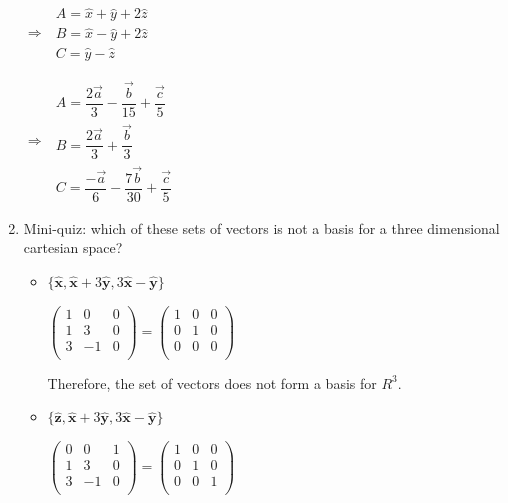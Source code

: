 \documentclass[fleqn]{article}
\begin{document}
\begin{enumerate}
  
  $\Rightarrow$ 
  $
  \begin{array}{lll}
    A = \hat{x}+\hat{y}+2\hat{z} \\
    B = \hat{x}-\hat{y}+2\hat{z}\\
    C = \hat{y}-\hat{z}
  \end{array}  
  $
  
  \bigbreak
  
  $\Rightarrow$ 
  $
  \begin{array}{lll}
    A = \dfrac{2\overrightarrow{a}}{3}-\dfrac{\overrightarrow{b}}{15}+\dfrac{\overrightarrow{c}}{5} \\
    B = \dfrac{2\overrightarrow{a}}{3}+\dfrac{\overrightarrow{b}}{3} \\
    C = \dfrac{-\overrightarrow{a}}{6}-\dfrac{7\overrightarrow{b}}{30}+\dfrac{\overrightarrow{c}}{5}
  \end{array}  
  $
  
  
  \item Mini-quiz: which of these sets of vectors is not a basis for a three dimensional cartesian space? 
  \begin{itemize}
  \item $\{ \mathbf{\hat{x}}, \mathbf{\hat{x}}+3\mathbf{\hat{y}}, 3\mathbf{\hat{x}}-\mathbf{\hat{y}} \}$
  
  \noindent
  $\displaystyle
    \begin{pmatrix}
      1 & 0 & 0 \\
      1 & 3 & 0 \\ 
      3 & -1 & 0 \\ 
    \end{pmatrix}
    =
    \begin{pmatrix}
      1 & 0 & 0 \\
      0 & 1 & 0 \\ 
      0 & 0 & 0 \\ 
    \end{pmatrix}
  $
  
  Therefore, the set of vectors does not form a basis for $R^3$.
  
  
  \item $\{ \mathbf{\hat{z}}, \mathbf{\hat{x}}+3\mathbf{\hat{y}}, 3\mathbf{\hat{x}}-\mathbf{\hat{y}}\}$
  
  \noindent
  $\displaystyle
    \begin{pmatrix}
      0 & 0 & 1 \\
      1 & 3 & 0 \\ 
      3 & -1 & 0 \\ 
    \end{pmatrix}
    =
    \begin{pmatrix}
      1 & 0 & 0 \\
      0 & 1 & 0 \\ 
      0 & 0 & 1 \\ 
    \end{pmatrix}
  $
  

\end{itemize}
\end{enumerate}
\end{document}
